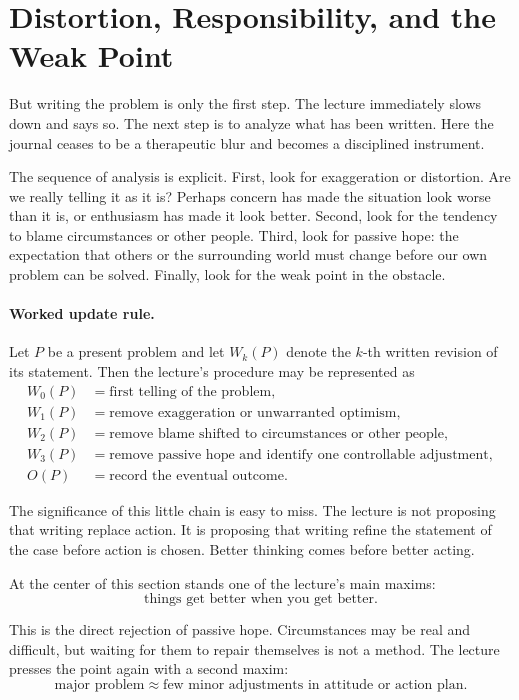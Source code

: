 \section{Distortion, Responsibility, and the Weak Point}

But writing the problem is only the first step. The lecture immediately slows down and says so. The next step is to analyze what has been written. Here the journal ceases to be a therapeutic blur and becomes a disciplined instrument.

The sequence of analysis is explicit. First, look for exaggeration or distortion. Are we really telling it as it is? Perhaps concern has made the situation look worse than it is, or enthusiasm has made it look better. Second, look for the tendency to blame circumstances or other people. Third, look for passive hope: the expectation that others or the surrounding world must change before our own problem can be solved. Finally, look for the weak point in the obstacle.

\paragraph{Worked update rule.}
Let \(P\) be a present problem and let \(W_k(P)\) denote the \(k\)-th written revision of its statement. Then the lecture's procedure may be represented as
\begin{align}
W_0(P)&=\text{first telling of the problem},\\
W_1(P)&=\text{remove exaggeration or unwarranted optimism},\\
W_2(P)&=\text{remove blame shifted to circumstances or other people},\\
W_3(P)&=\text{remove passive hope and identify one controllable adjustment},\\
O(P)&=\text{record the eventual outcome}.
\end{align}

The significance of this little chain is easy to miss. The lecture is not proposing that writing replace action. It is proposing that writing refine the statement of the case before action is chosen. Better thinking comes before better acting.

At the center of this section stands one of the lecture's main maxims:
\begin{equation}
\text{things get better when you get better}.
\end{equation}

This is the direct rejection of passive hope. Circumstances may be real and difficult, but waiting for them to repair themselves is not a method. The lecture presses the point again with a second maxim:
\begin{equation}
\text{major problem}\approx \text{few minor adjustments in attitude or action plan}.
\end{equation}

